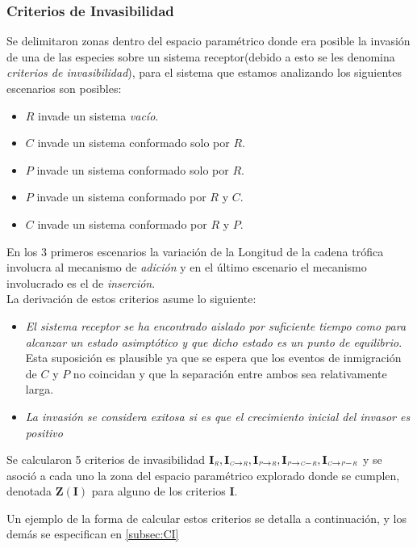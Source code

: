 \subsubsection{Criterios de Invasibilidad}
Se delimitaron zonas dentro del espacio param\'etrico donde era posible la invasi\'on de una de las especies sobre un sistema receptor(debido a esto se les denomina \emph{criterios de invasibilidad}), para el sistema que estamos analizando los siguientes escenarios son posibles: 
\begin{itemize}
\item $R$ invade un sistema \emph{vac\'io}.
\item $C$ invade un sistema conformado solo por $R$.
\item $P$ invade un sistema conformado solo por $R$.
\item $P$ invade un sistema conformado por $R$ y $C$.
\item $C$ invade un sistema conformado por $R$ y $P$.
\end{itemize}
En los 3 primeros escenarios la variaci\'on de la Longitud de la cadena tr\'ofica involucra al mecanismo de \textit{adici\'on} y en el \'ultimo escenario el mecanismo involucrado es el de \textit{inserci\'on}.\\

La derivaci\'on de estos criterios asume lo siguiente:
\begin{itemize}
\item \emph{El sistema receptor se ha encontrado aislado por suficiente tiempo como para alcanzar un estado asimpt\'otico y que dicho estado es un punto de equilibrio}.\\Esta suposici\'on es plausible ya que se espera que los eventos de inmigraci\'on de $C$ y $P$ no coincidan y que la separaci\'on entre ambos sea relativamente larga.
\item \emph{La invasi\'on se considera exitosa si es que el crecimiento inicial del invasor es positivo}
\end{itemize}

Se calcularon 5 criterios de invasibilidad $\mathbf{I_{\textit{\tiny R}},I_{\textit{\tiny C} \to \textit{\tiny R}},I_{\textit{\tiny P} \to \textit{\tiny R}},I_{\textit{\tiny P} \to \textit{\tiny C}-\textit{\tiny R}},I_{\textit{\tiny C} \to \textit{\tiny P}-\textit{\tiny R}}}$ y se asoci\'o a cada uno la zona del espacio param\'etrico explorado donde se cumplen, denotada $\mathbf{Z(I)}$ para alguno de los criterios $\mathbf{I}$.

Un ejemplo de la forma de calcular estos criterios se detalla a continuaci\'on, y los dem\'as se especifican en \ref{subsec:CI} 

